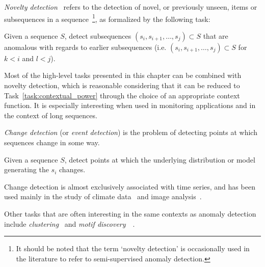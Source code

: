 \emph{Novelty detection}~\cite{chandola} refers to the detection of novel, or previously unseen, items or subsequences in a sequence~\footnote{It should be noted that the term `novelty detection' is occasionally used in the literature to refer to semi-supervised anomaly detection.}, as formalized by the following task:
\begin{task}
\label{task:novelty_detection}
  Given a sequence $S$, detect subsequences $(s_i, s_{i+1}, \dots, s_j) \subset S$ that are anomalous with regards to earlier subsequences (i.e. $(s_i, s_{i+1}, \dots, s_j) \subset S$ for $k < i$ and $l < j$).
\end{task}
Most of the high-level tasks presented in this chapter can be combined with novelty detection, which is reasonable considering that it can be reduced to Task~\ref{task:contextual_power} through the choice of an appropriate context function. It is especially interesting when used in monitoring applications and in the context of long sequences.

\emph{Change detection} (or \emph{event detection}) is the problem of detecting points at which sequences change in some way.
\begin{task}
      Given a sequence $S$, detect points at which the underlying distribution or model generating the $s_i$ changes.
\end{task}
Change detection is almost exclusively associated with time series, and has been used mainly in the study of climate data~\cite{gopala} and image analysis~\cite{radke}.

Other tasks that are often interesting in the same contexts as anomaly detection include \emph{clustering}~\cite{clustering} and \emph{motif discovery}~\cite{motif}~\cite{motif2}.

